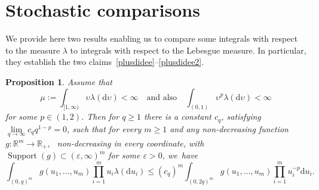 \documentclass[10pt]{amsart}
\newtheorem{proposition}[theorem]{Proposition}
\theoremstyle{definition}
\newcommand{\dd}{\mathrm{d}}
\DeclareMathOperator*{\supp}{\mathrm{Support}}
\newcommand{\bbR}{{\ensuremath{\mathbb R}} }
\let\gep\varepsilon
\let\ups\upsilon
\begin{document}
\section{Stochastic comparisons}

We provide here
two results enabling us to compare some integrals
with respect to the measure $\lambda$ to integrals with respect
to the Lebesgue measure.
In particular, they establish the two claims~\eqref{plusdidee}--\eqref{plusdidee2}.

\begin{proposition}
\label{prop:compare1}
Assume that
\[
\mu:=\int_{[1,\infty)} \ups \lambda(\dd \ups) <\infty\quad\text{and also}\quad \int_{(0,1)} \ups^p \lambda(\dd \ups) <\infty
\]
for some $p \in (1,2)$. Then for $q\geq 1$ there is
a constant $c_q$, satisfying $\lim\limits_{q\to\infty} c_q q^{1-p} =0$,
such that for every $m\geq 1$ and any non-decreasing function $g:\bbR^m \to \bbR_+$, \ie \ non-decreasing in every coordinate, with $\supp(g)\subset (\gep,\infty)^m$ for some $\gep>0$, we~have
\[
\int_{(0,q)^m} g(u_1, \ldots, u_m) \prod_{i=1}^m u_i \lambda(\dd u_i) \leq (c_q)^m \int_{(0,2q)^m} g(u_1, \ldots, u_m) \prod_{i=1}^m u_i^{-p} \dd u_i.
\]
\end{proposition}
\end{document}
